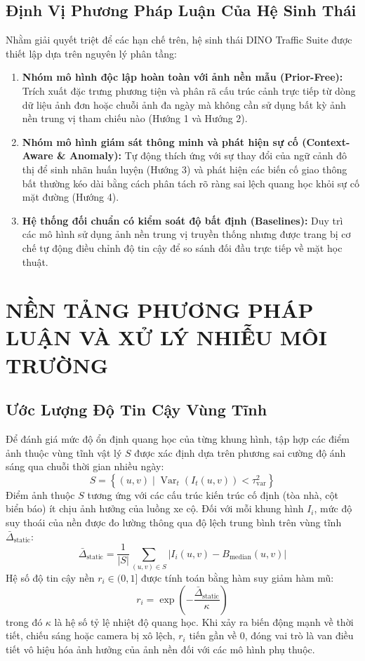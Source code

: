 \documentclass[11pt,a4paper]{article}
\begin{document}
\subsection{Định Vị Phương Pháp Luận Của Hệ Sinh Thái}
Nhằm giải quyết triệt để các hạn chế trên, hệ sinh thái DINO Traffic Suite được thiết lập dựa trên nguyên lý phân tầng:
\begin{enumerate}
    \item \textbf{Nhóm mô hình độc lập hoàn toàn với ảnh nền mẫu (Prior-Free):} Trích xuất đặc trưng phương tiện và phân rã cấu trúc cảnh trực tiếp từ dòng dữ liệu ảnh đơn hoặc chuỗi ảnh đa ngày mà không cần sử dụng bất kỳ ảnh nền trung vị tham chiếu nào (Hướng 1 và Hướng 2).
    \item \textbf{Nhóm mô hình giám sát thông minh và phát hiện sự cố (Context-Aware \& Anomaly):} Tự động thích ứng với sự thay đổi của ngữ cảnh đô thị để sinh nhãn huấn luyện (Hướng 3) và phát hiện các biến cố giao thông bất thường kéo dài bằng cách phân tách rõ ràng sai lệch quang học khỏi sự cố mặt đường (Hướng 4).
    \item \textbf{Hệ thống đối chuẩn có kiểm soát độ bất định (Baselines):} Duy trì các mô hình sử dụng ảnh nền trung vị truyền thống nhưng được trang bị cơ chế tự động điều chỉnh độ tin cậy để so sánh đối đầu trực tiếp về mặt học thuật.
\end{enumerate}

\section{NỀN TẢNG PHƯƠNG PHÁP LUẬN VÀ XỬ LÝ NHIỄU MÔI TRƯỜNG}

\subsection{Ước Lượng Độ Tin Cậy Vùng Tĩnh}
Để đánh giá mức độ ổn định quang học của từng khung hình, tập hợp các điểm ảnh thuộc vùng tĩnh vật lý $S$ được xác định dựa trên phương sai cường độ ánh sáng qua chuỗi thời gian nhiều ngày:
\begin{equation}
    S = \left\{(u, v) \mid \operatorname{Var}_{t}(I_t(u, v)) < \tau_{\text{var}}^2 \right\}
\end{equation}
Điểm ảnh thuộc $S$ tương ứng với các cấu trúc kiến trúc cố định (tòa nhà, cột biển báo) ít chịu ảnh hưởng của luồng xe cộ. Đối với mỗi khung hình $I_i$, mức độ suy thoái của nền được đo lường thông qua độ lệch trung bình trên vùng tĩnh $\bar{\Delta}_{\text{static}}$:
\begin{equation}
    \bar{\Delta}_{\text{static}} = \frac{1}{|S|} \sum_{(u, v) \in S} |I_i(u, v) - B_{\text{median}}(u, v)|
\end{equation}
Hệ số độ tin cậy nền $r_i \in (0, 1]$ được tính toán bằng hàm suy giảm hàm mũ:
\begin{equation}
    r_i = \exp\left( -\frac{\bar{\Delta}_{\text{static}}}{\kappa} \right)
\end{equation}
trong đó $\kappa$ là hệ số tỷ lệ nhiệt độ quang học. Khi xảy ra biến động mạnh về thời tiết, chiếu sáng hoặc camera bị xô lệch, $r_i$ tiến gần về 0, đóng vai trò là van điều tiết vô hiệu hóa ảnh hưởng của ảnh nền đối với các mô hình phụ thuộc.
\end{document}
